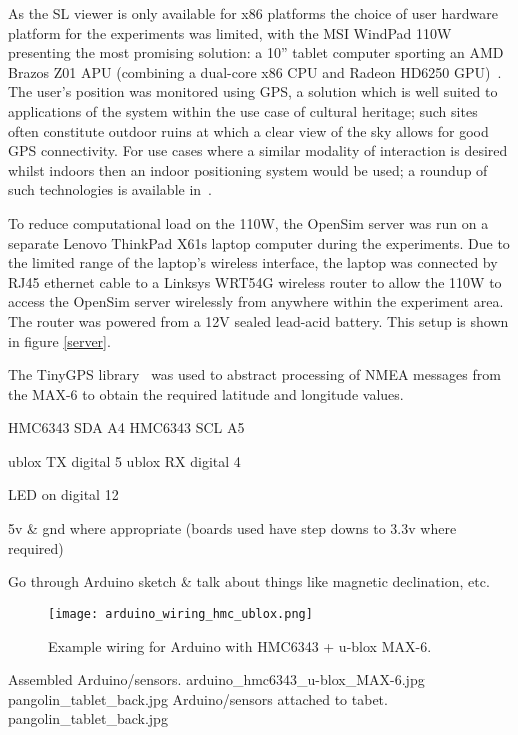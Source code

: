 As the SL viewer is only available for x86 platforms the choice of user hardware platform for the experiments was limited, with the MSI WindPad 110W presenting the most promising solution: a 10'' tablet computer sporting an AMD Brazos Z01 APU (combining a dual-core x86 CPU and Radeon HD6250 GPU)~\cite{Micro-StarInt'lCo.}. The user's position was monitored using GPS, a solution which is well suited to applications of the system within the use case of cultural heritage; such sites often constitute outdoor ruins at which a clear view of the sky allows for good GPS connectivity. For use cases where a similar modality of interaction is desired whilst indoors then an indoor positioning system would be used; a roundup of such technologies is available in~\cite{Mautz2012}.

To reduce computational load on the 110W, the OpenSim server was run on a separate Lenovo ThinkPad X61s laptop computer during the experiments. Due to the limited range of the laptop's wireless interface, the laptop was connected by RJ45 ethernet cable to a Linksys WRT54G wireless router to allow the 110W to access the OpenSim server wirelessly from anywhere within the experiment area. The router was powered from a 12V sealed lead-acid battery. This setup is shown in figure \ref{server}.



The TinyGPS library~\cite{Hart} was used to abstract processing of NMEA messages from the MAX-6 to obtain the required latitude and longitude values.

HMC6343 SDA A4
HMC6343 SCL A5

ublox TX digital 5
ublox RX digital 4

LED on digital 12

5v \& gnd where appropriate (boards used have step downs to 3.3v where required)

Go through Arduino sketch \& talk about things like magnetic declination, etc.

\begin{figure}[h]
\centering
  \texttt{[image: arduino\_wiring\_hmc\_ublox.png]}
  \caption{Example wiring for Arduino with HMC6343 + u-blox MAX-6.}
  \label{arduino_wiring_hmc_ublox.png}
\end{figure}

 {Assembled Arduino/sensors.} {arduino_hmc6343_u-blox_MAX-6.jpg}
       {pangolin_tablet_back.jpg} {Arduino/sensors attached to tabet.} {pangolin_tablet_back.jpg}

